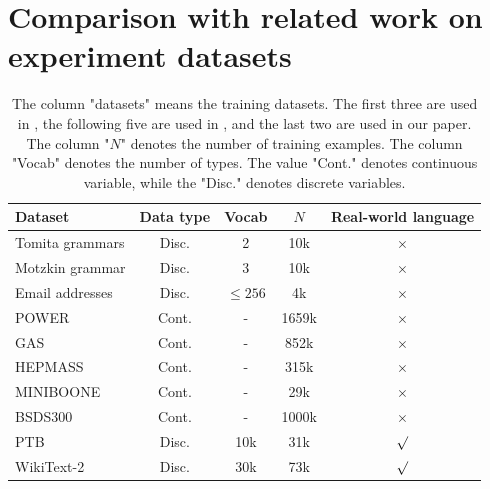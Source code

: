 \documentclass{article}
\theoremstyle{plain}
\theoremstyle{definition}
\theoremstyle{remark}
\begin{document}
\section{Comparison with related work on experiment datasets}
\label{sec:datasets}
\begin{table}[t]
    \centering
    \begin{tabular}{l|c|c|c|c}
    \toprule
        Dataset & Data type & Vocab  & $N$ & Real-world language  \\
         \midrule
        Tomita grammars  \cite{tomita1982dynamic}  & Disc. & 2  & 10k & $\times$ \\ 
        Motzkin grammar \citep{alexander2021exact} & Disc. & 3 & 10k   &$\times$ \\
         Email addresses \citep{radev2008clair} & Disc. & $\leq 256$ & 4k & $\times$  \\
        \midrule
        POWER  \cite{Dua:2019} & Cont. & - & 1659k & $\times$ \\
        GAS \cite{fonollosa2015reservoir} & Cont. & - & 852k &  $\times$ \\
        HEPMASS \cite{baldi2016parameterized} & Cont. & - & 315k & $\times$  \\
        MINIBOONE \cite{roe2005boosted} & Cont. & -  & 29k & $\times$  \\
        BSDS300 \citep{martin2001database}  & Cont. & - & 1000k &  $\times$ \\
         
        \midrule
        PTB \citep{marcinkiewicz1994building} & Disc. & 10k  & 31k & $\surd$ \\
        WikiText-2  \citep{merity2016pointer} & Disc. & 30k & 73k &  $\surd$ \\  
        
 \bottomrule
    \end{tabular}
    \caption{The column "datasets" means the training datasets. The first three are used in  \citep{miller2021tensor}, the following five are used in  \cite{novikov2021tensor}, and the last two are used in our paper.  The column "$N$" denotes the number of training examples. The column "Vocab" denotes the number of types. The value "Cont." denotes continuous variable, while the "Disc." denotes  discrete variables. }
    \label{tab:datasets}
\end{table}
\end{document}
